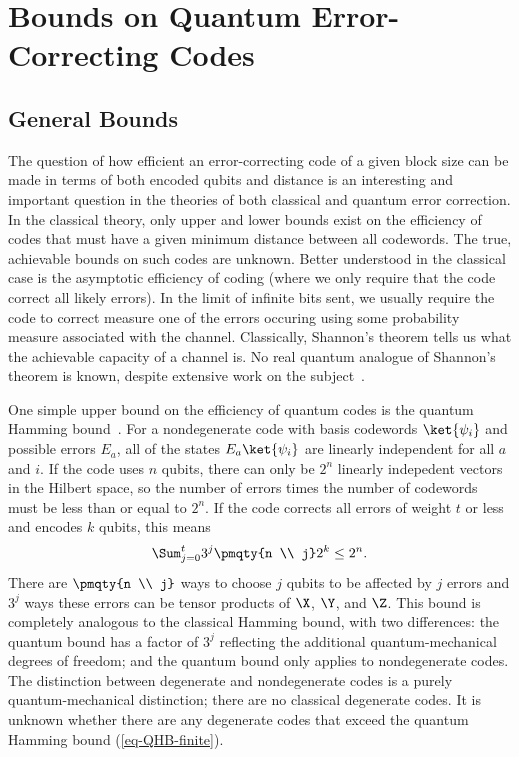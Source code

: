 \pagestyle{myheadings}

\chapter{Bounds on Quantum Error-Correcting Codes}
\label{chap-bounds}

\section{General Bounds}
\label{sec-gen-bounds}
\pagestyle{headings}

The question of how efficient an error-correcting code of a given block size
can be made in terms of both encoded qubits and distance is an interesting
and important question in the theories of both classical and quantum error
correction.  In the classical theory, only upper and lower bounds exist on
the efficiency of codes that must have a given minimum distance between
all codewords.  The true, achievable bounds on such codes are unknown.
Better understood in the classical case is the asymptotic efficiency of coding
(where we only require that the code correct all likely errors).  In the limit
of infinite bits sent, we usually require the code to correct measure one of
the errors occuring using some probability measure associated with the channel.
Classically, Shannon's theorem tells us what the achievable capacity of a
channel is.  No real quantum analogue of Shannon's theorem is known, despite
extensive work on the subject~\cite{lloyd, schumacher, barnum}.

One simple upper bound on the efficiency of quantum codes is the
quantum Hamming bound~\cite{ekert}.  For a nondegenerate code with
basis codewords $\ket{\psi_i}$ and possible errors $E_a$, all of the states
$E_a \ket{\psi_i}$ are linearly independent for all $a$ and $i$.  If the code
uses $n$ qubits, there can only be $2^n$ linearly indepedent vectors in the
Hilbert space, so the number of errors times the number of codewords
must be less than or equal to $2^n$.  If the code corrects all errors of
weight $t$ or less and encodes $k$ qubits, this means
\begin{equation}
	\Sum_{j=0}^{t} 3^j \pmqty{n \\ j} 2^k \leq 2^n.
	\label{eq-QHB-finite}
\end{equation}
There are \mbox{\tiny $\pmqty{n \\ j}$} ways to choose $j$ qubits to be
affected by $j$ errors and $3^j$ ways these errors can be tensor products of
$\X$, $\Y$, and $\Z$.  This bound is completely analogous to the classical
Hamming bound, with two differences: the quantum bound has a factor of $3^j$
reflecting the additional quantum-mechanical degrees of freedom; and the
quantum bound only applies to nondegenerate codes.  The distinction
between degenerate and nondegenerate codes is a purely
quantum-mechanical distinction; there are no classical degenerate codes.
It is unknown whether there are any degenerate codes that exceed the
quantum Hamming bound (\ref{eq-QHB-finite}).

